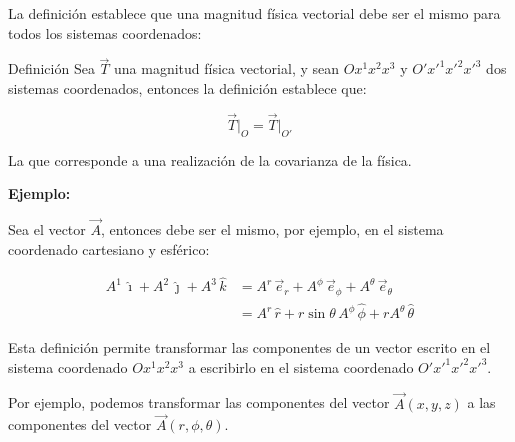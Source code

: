 \documentclass[../apunte_mecanica_clasica.tex]{subfiles}%
\begin{document}
La definición establece que una magnitud física vectorial debe ser el mismo para todos los sistemas coordenados:

\begin{apuntebloque}{Definición}
Sea $\vec{T}$ una magnitud física vectorial, y sean $Ox^1x^2x^3$ y $O'x'^1x'^2x'^3$ dos sistemas coordenados, entonces la definición establece que:

\begin{equation*}
\vec{T}\big|_O = \vec{T}\big|_{O'}
\end{equation*}
\end{apuntebloque}

La que corresponde a una realización de la covarianza de la física.

\textbf{Ejemplo:}

Sea el vector $\vec{A}$, entonces debe ser el mismo, por ejemplo, en el sistema coordenado cartesiano y esférico:

\begin{equation}\label{bases_13}
\begin{aligned}
A^1\, \hat{\imath} + A^2\, \hat{\jmath} + A^3\, \hat{k} &= A^r\, \vec{e}_r + A^\phi\, \vec{e}_\phi + A^\theta\, \vec{e}_\theta \\
&= A^r\, \hat{r} + r \sin \theta\, A^\phi\, \hat{\phi} + r A^\theta\, \hat{\theta}    
\end{aligned}
\end{equation}

Esta definición permite transformar las componentes de un vector escrito en el sistema coordenado $Ox^1x^2x^3$ a escribirlo en el sistema coordenado $O'x'^1x'^2x'^3$.

Por ejemplo, podemos transformar las componentes del vector $\vec{A}(x, y, z)$ a las componentes del vector $\vec{A}(r, \phi, \theta)$.
\end{document}
